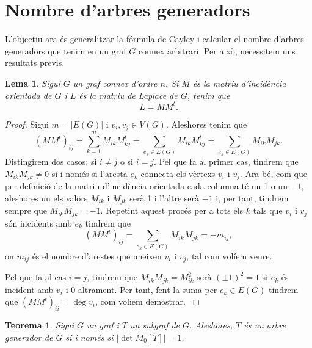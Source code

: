 \documentclass{article}
\newtheorem{theorem}{Teorema}[section]
\newtheorem{lemma}{Lema}[section]
\begin{document}
\section{Nombre d'arbres generadors}
L'objectiu ara és generalitzar la fórmula de Cayley i calcular el nombre d'arbres generadors que tenim en un graf $G$ connex arbitrari. Per això, necessitem uns resultats previs.
\begin{lemma}\label{1}
    Sigui $G$ un graf connex d'ordre $n$. Si $M$ és la matriu d'incidència orientada de $G$ i $L$ és la matriu de Laplace de $G$, tenim que $$L=MM^t.$$
\end{lemma}
\begin{proof}
    Sigui $m=|E(G)|$ i $v_i,v_j\in V(G)$. Aleshores tenim que $$(MM^t)_{ij}=\sum_{k=1}^mM_{ik}M_{kj}^t=\sum_{e_k\in E(G)}M_{ik}M_{kj}^t=\sum_{e_k\in E(G)}M_{ik}M_{jk}.$$
    Distingirem dos casos: si $i\ne j$ o si $i=j$. Pel que fa al primer cas, tindrem que $M_{ik}M_{jk}\ne 0$ si i només si l'aresta $e_k$ connecta els vèrtexs $v_i$ i $v_j$. Ara bé, com que per definició de la matriu d'incidència orientada cada columna té un 1 o un $-1$, aleshores un els valors $M_{ik}$ i $M_{jk}$ serà 1 i l'altre serà $-1$ i, per tant, tindrem sempre que $M_{ik}M_{jk}=-1$. Repetint aquest procés per a tots els $k$ tals que $v_i$ i $v_j$ són incidents amb $e_k$ tindrem que $$(MM^t)_{ij}=\sum_{e_k\in E(G)}M_{ik}M_{jk}=-m_{ij},$$ on $m_{ij}$ és el nombre d'arestes que uneixen $v_i$ i $v_j$, tal com volíem veure.\par
    Pel que fa al cas $i=j$, tindrem que $M_{ik}M_{jk}=M_{ik}^2$ serà $(\pm 1)^2=1$ si $e_k$ és incident amb $v_i$ i 0 altrament. Per tant, fent la suma per $e_k\in E(G)$ tindrem que $(MM^t)_{ii}=\deg v_i$, com volíem demostrar. \cite{2}
\end{proof}
\begin{theorem}\label{2}
    Sigui $G$ un graf i $T$ un subgraf de $G$. Aleshores, $T$ és un arbre generador de $G$ si i només si $|\det M_0[T]|=1$.
\end{theorem}
\end{document}
